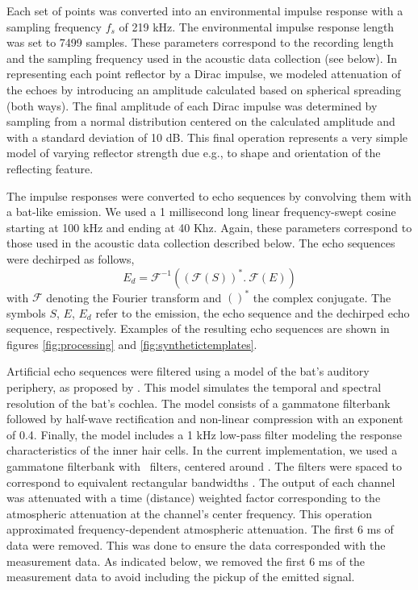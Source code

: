 \documentclass[preprint,5p]{elsarticle}
\begin{document}
Each set of points was converted into an environmental impulse response with a sampling frequency $f_s$ of 219 kHz. The environmental impulse response length was set to 7499 samples. These parameters correspond to the recording length and the sampling frequency used in the acoustic data collection (see below). In representing each point reflector by a Dirac impulse, we modeled attenuation of the echoes by introducing an amplitude calculated based on spherical spreading (both ways). The final amplitude of each Dirac impulse was determined by sampling from a normal distribution centered on the calculated amplitude and with a standard deviation of 10 dB. This final operation represents a very simple model of varying reflector strength due e.g., to shape and orientation of the reflecting feature.

The impulse responses were converted to echo sequences by convolving them with a bat-like emission. We used a 1 millisecond long linear frequency-swept cosine starting at 100 kHz and ending at 40 Khz. Again, these parameters correspond to those used in the acoustic data collection described below. The echo sequences were dechirped as follows, 
%
%
\begin{equation}\label{key}
E_d = \mathcal{F}^{-1}((\mathcal{F}(S))^* . \ \mathcal{F}(E))
\end{equation}
with $\mathcal{F}$ denoting the Fourier transform and $()^*$ the complex conjugate. The symbols $S$, $E$, $E_d$ refer to the emission, the echo sequence and the dechirped echo sequence, respectively. Examples of the resulting echo sequences are shown in figures \ref{fig:processing} and \ref{fig:synthetictemplates}. 

Artificial echo sequences were filtered using a model of the bat's auditory periphery, as proposed by \citet{Wiegrebe2008}. This model simulates the temporal and spectral resolution of the bat's cochlea. The model consists of a gammatone filterbank followed by half-wave rectification and non-linear compression with an exponent of 0.4. Finally, the model includes a 1 kHz low-pass filter modeling the response characteristics of the inner hair cells. In the current implementation, we used a gammatone filterbank with \nfilters\ filters, centered around \FilterCenter. The filters were spaced to correspond to equivalent rectangular bandwidths \citep{Glasberg1990}. The output of each channel was attenuated with a time (distance) weighted factor corresponding to the atmospheric attenuation at the channel's center frequency. This operation approximated frequency-dependent atmospheric attenuation. The first 6 ms of data were removed. This was done to ensure the data corresponded with the measurement data. As indicated below, we removed the first 6 ms of the measurement  data to avoid including the pickup of the emitted signal. 
\end{document}
